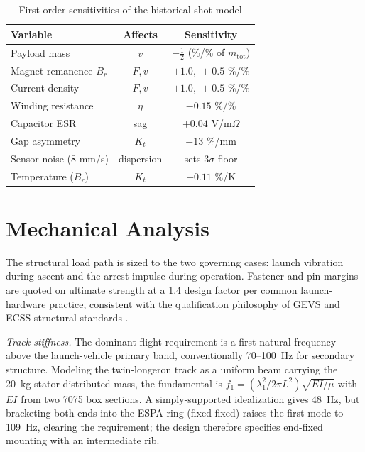 \documentclass[conference]{IEEEtran}
\begin{document}
\begin{table}[t]
\caption{First-order sensitivities of the historical shot model}
\label{tab:sens}
\centering\footnotesize
\begin{tabular}{lcc}
\toprule
Variable & Affects & Sensitivity\\
\midrule
Payload mass & $v$ & $-\tfrac{1}{2}$ (\%/\% of $m_{\mathrm{tot}}$)\\
Magnet remanence $B_r$ & $F,v$ & $+1.0,\ +0.5$ \%/\%\\
Current density & $F,v$ & $+1.0,\ +0.5$ \%/\%\\
Winding resistance & $\eta$ & $-0.15$ \%/\%\\
Capacitor ESR & sag & $+0.04$ V/m$\Omega$\\
Gap asymmetry & $K_t$ & $-13$ \%/mm\\
Sensor noise (8 mm/s) & dispersion & sets 3$\sigma$ floor\\
Temperature ($B_r$) & $K_t$ & $-0.11$ \%/K\\
\bottomrule
\end{tabular}
\end{table}

\section{Mechanical Analysis}\label{sec:mech}
The structural load path is sized to the two governing cases: launch vibration during ascent and the arrest impulse during operation. Fastener and pin margins are quoted on ultimate strength at a 1.4 design factor per common launch-hardware practice, consistent with the qualification philosophy of GEVS \cite{gevs} and ECSS structural standards \cite{ecss}.

\emph{Track stiffness.} The dominant flight requirement is a first natural frequency above the launch-vehicle primary band, conventionally 70--100~Hz for secondary structure. Modeling the twin-longeron track as a uniform beam carrying the 20~kg stator distributed mass, the fundamental is $f_1=(\lambda_1^2/2\pi L^2)\sqrt{EI/\mu}$ with $EI$ from two 7075 box sections. A simply-supported idealization gives 48~Hz, but bracketing both ends into the ESPA ring (fixed-fixed) raises the first mode to 109~Hz, clearing the requirement; the design therefore specifies end-fixed mounting with an intermediate rib.
\end{document}
